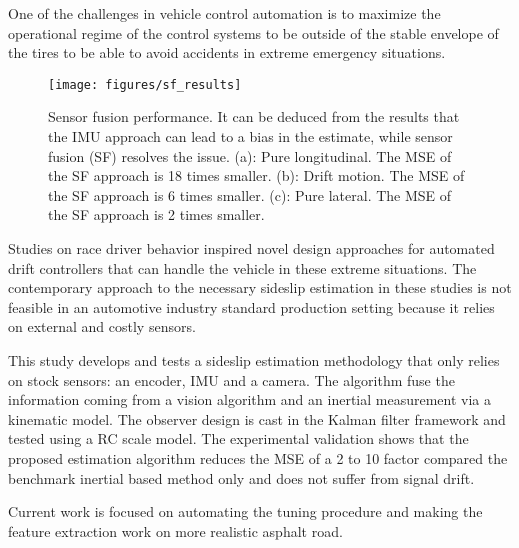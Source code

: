 \documentclass[letterpaper, 10 pt, conference]{ieeeconf}
\begin{document}
One of the challenges in vehicle control automation is to maximize the operational regime of the control systems to be outside of the stable envelope of the tires to be able to avoid accidents in extreme emergency situations. 
\begin{figure*}[!h]
\centering
{}
{\texttt{[image: figures/sf\_results]}}
\caption{ Sensor fusion performance. It can be deduced from the results that the IMU approach can lead to a bias in the estimate, while sensor fusion (SF) resolves the issue. (a): Pure longitudinal. The MSE of the SF approach is 18 times smaller.  (b): Drift motion. The MSE of the SF approach is 6 times smaller. (c): Pure lateral. The MSE of the SF approach is 2 times smaller.}
\label{fig:sf_results}
\end{figure*}
Studies on race driver behavior inspired novel design approaches for automated drift controllers that can handle the vehicle in these extreme situations. The contemporary approach to the necessary sideslip estimation in these studies is not feasible in an automotive industry standard production setting because it relies on external and costly sensors. 

This study develops and tests a sideslip estimation methodology that only relies on stock sensors: an encoder, IMU and a camera.  The algorithm fuse the information coming from a  vision algorithm and an inertial measurement via a kinematic model.  The observer design is cast in the Kalman filter framework and tested using a RC scale model. The experimental validation shows that the proposed estimation algorithm reduces the MSE of a 2 to 10 factor compared the benchmark inertial based method only and does not suffer from signal drift.

Current work is focused on automating the tuning procedure and making the feature extraction work on more realistic asphalt road.    





\end{document}
